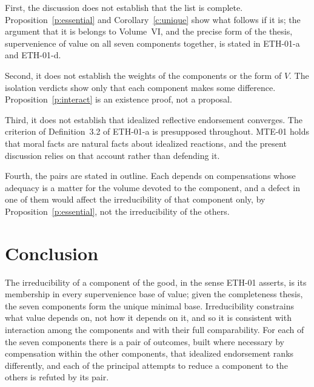 \documentclass{situationist-preprint}
\begin{document}
First, the discussion does not establish that the list is complete. Proposition~\ref{p:essential} and Corollary~\ref{c:unique} show what follows if it is; the argument that it is belongs to Volume~VI, and the precise form of the thesis, supervenience of value on all seven components together, is stated in ETH-01-a and ETH-01-d.

Second, it does not establish the weights of the components or the form of $V$. The isolation verdicts show only that each component makes some difference. Proposition~\ref{p:interact} is an existence proof, not a proposal.

Third, it does not establish that idealized reflective endorsement converges. The criterion of Definition~3.2 of ETH-01-a is presupposed throughout. MTE-01 holds that moral facts are natural facts about idealized reactions, and the present discussion relies on that account rather than defending it.

Fourth, the pairs are stated in outline. Each depends on compensations whose adequacy is a matter for the volume devoted to the component, and a defect in one of them would affect the irreducibility of that component only, by Proposition~\ref{p:essential}, not the irreducibility of the others.

\section{Conclusion}

The irreducibility of a component of the good, in the sense ETH-01 asserts, is its membership in every supervenience base of value; given the completeness thesis, the seven components form the unique minimal base. Irreducibility constrains what value depends on, not how it depends on it, and so it is consistent with interaction among the components and with their full comparability. For each of the seven components there is a pair of outcomes, built where necessary by compensation within the other components, that idealized endorsement ranks differently, and each of the principal attempts to reduce a component to the others is refuted by its pair.
\end{document}
